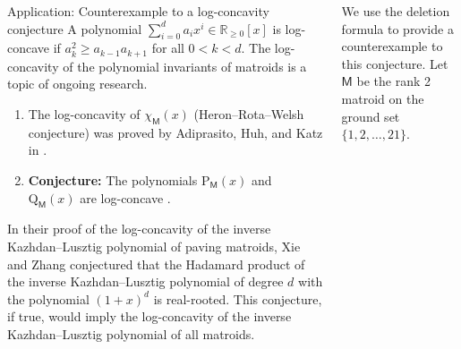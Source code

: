 \documentclass[final]{beamer}
\newlength{\twocolwid}
\newlength{\threecolwid}
\newcommand{\M}{\mathsf{M}}
\begin{document}
\begin{frame}[t]
\begin{columns}[t]
\begin{column}{\twocolwid}
\begin{block}{Application: Counterexample to a log-concavity conjecture}
A polynomial \(\sum_{i=0}^d{a_i x^i} \in \mathbb{R}_{\geq 0}[x]\)
is log-concave if \(a_k^2 \geq a_{k-1} a_{k+1}\) for all \(0<k<d\).
The log-concavity of the polynomial invariants of matroids
is a topic of ongoing research.
\begin{enumerate}
    \item The log-concavity of \(\chi_\M(x)\)
    (Heron--Rota--Welsh conjecture) was proved by Adiprasito, Huh, and Katz in
    \cite{adiprasito-huh-katz}.
    \item \textbf{Conjecture:} The polynomials
    \(\mathrm{P}_\M(x)\) and \(\mathrm{Q}_\M(x)\)
        are log-concave \cite{gedeon-proudfoot-young-survey,gao-xie}.
\end{enumerate}
In their proof of the log-concavity of the inverse Kazhdan--Lusztig polynomial
of paving matroids, Xie and Zhang conjectured that the
Hadamard product of the inverse Kazhdan--Lusztig polynomial of degree $d$
with the polynomial \((1+x)^d\) is real-rooted.
This conjecture, if true,
would imply the log-concavity of the inverse Kazhdan--Lusztig polynomial
of all matroids. 
\end{block}
\end{column} %

\begin{column}{\threecolwid} %

\vspace{-20mm}
\begin{block}{}
We use the deletion formula to provide a counterexample
to this conjecture.
Let $\M$ be the rank 2 matroid on the ground set $\{1,2,\ldots, 21\}$.
\begin{figure}
\end{figure}
\end{block}
\end{column}
\end{columns}
\end{frame}
\end{document}
